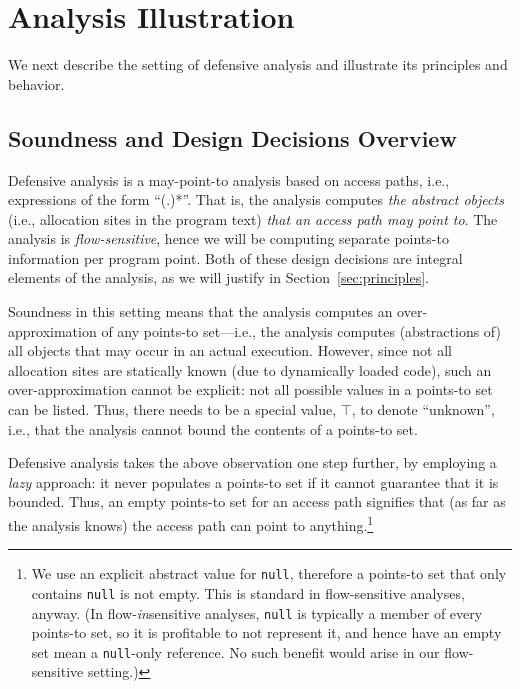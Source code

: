 \section{Analysis Illustration}
\label{sec:illustration}

We next describe the setting of defensive analysis and illustrate its
principles and behavior.


\subsection{Soundness and Design Decisions Overview}

Defensive analysis is a may-point-to analysis based on access
paths, i.e., expressions of the form ``(.)*''.
That is, the analysis computes \emph{the abstract objects} (i.e.,
allocation sites in the program text) \emph{that an access path may
  point to}. The analysis is \emph{flow-sensitive}, hence we will be
computing separate points-to information per program point. Both of these
design decisions are integral elements of the analysis, as we will
justify in Section~\ref{sec:principles}.

Soundness in this setting means that the analysis computes an
over-approximation of any points-to set---i.e., the analysis computes
(abstractions of) all objects that may occur in an actual
execution. However, since not all allocation sites are statically
known (due to dynamically loaded code), such an over-approximation
cannot be explicit: not all possible values in a points-to set can be
listed.  Thus, there needs to be a special value, $\top$, to denote
``unknown'', i.e., that the analysis cannot bound the contents of a
points-to set.

Defensive analysis takes the above observation one step further, by employing a
\emph{lazy} approach: it never populates a points-to set if it cannot
guarantee that it is bounded. Thus, an empty points-to set for an
access path signifies that (as far as the analysis knows) the access
path can point to anything.\footnote{We use an explicit abstract value
  for \texttt{null}, therefore a points-to set that only contains
  \texttt{null} is not empty. This is standard in flow-sensitive
  analyses, anyway. (In flow-\emph{in}sensitive analyses,
  \texttt{null} is typically a member of every points-to set, so it is
  profitable to not represent it, and hence have an empty set mean a
  \texttt{null}-only reference. No such benefit would arise in our
  flow-sensitive setting.)}

